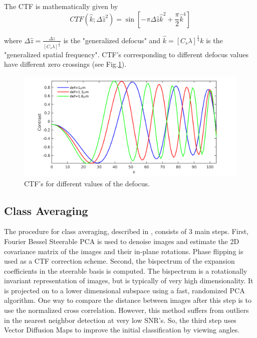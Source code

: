 \documentclass{article}
\begin{document}
The CTF is mathematically given by \cite{frankctf}
\begin{equation}
CTF(\hat{k};\Delta\hat{z}^2)= \sin[-\pi \Delta\hat{z}\hat{k}^2 + \frac{\pi}{2} \hat{k}^4]
\label{eq:ctf}
\end{equation}

where 
$\Delta\hat{z}=\frac{\Delta z}{[C_s \lambda]^{\frac{1}{2}}}$ is the "generalized defocus" and $\hat{k}=[C_s \lambda]^{\frac{1}{4}}k$ is the "generalized spatial frequency". CTF's corresponding to different defocus values have different zero crossings (see Fig.\ref{fig:ctf}).

\begin{figure}
\begin{center}
\includegraphics[scale=0.4]{ctfeg_fig.png}
\caption{CTF's for different values of the defocus.}\label{fig:ctf}
\end{center}

\end{figure}


\subsection{Class Averaging}
The procedure for class averaging, described in \cite{zhao}, consists of 3 main steps. First, Fourier Bessel Steerable PCA is used to denoise images and estimate the 2D covariance matrix of the images and their in-plane rotations. Phase flipping is used as a CTF correction scheme. Second, the bispectrum of the expansion coefficients in the steerable basis is computed. The bispectrum is a rotationally invariant representation of images, but is typically of very high dimensionality. It is projected on to a lower dimensional subspace using a fast, randomized PCA algorithm. One way to compare the distance between images after this step is to use the normalized cross correlation. However, this method suffers from outliers in the nearest neighbor detection at very low SNR's. So, the third step uses Vector Diffusion Maps to improve the initial classification by viewing angles.
\end{document}
